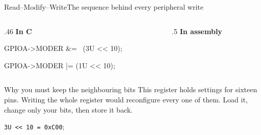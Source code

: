 \documentclass[9pt,aspectratio=169,xcolor=table]{beamer}
\begin{document}
\begin{frame}[fragile]{Read--Modify--Write}{The sequence behind every peripheral write}
    \begin{columns}[T]
    \begin{column}{.46\textwidth}
        \textbf{In C}

        \vspace{1mm}
        \begin{cc}
GPIOA->MODER &=
        ~(3U << 10);

GPIOA->MODER |=
        (1U << 10);
        \end{cc}
    \end{column}
    \begin{column}{.5\textwidth}
        \textbf{In assembly}

        \vspace{1mm}
    \end{column}
    \end{columns}

    \vspace{3mm}
    \begin{block}{Why you must keep the neighbouring bits}
        This register holds settings for \alert{sixteen pins}. Writing
        the whole register would reconfigure every one of them.
        \alert{Load it, change only your bits, then store it back.}
    \end{block}

    \vspace{1mm}
    \texttt{3U \texttt{<}< 10 = 0xC00}; 
\end{frame}
\end{document}
